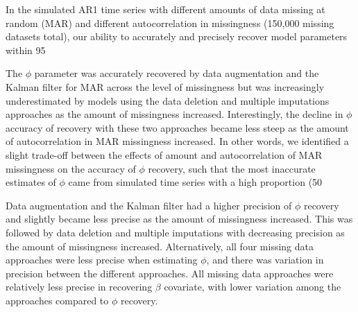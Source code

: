 In the simulated AR1 time series with different amounts of data missing at random (MAR) and different autocorrelation in missingness (150,000 missing datasets total), our ability to accurately and precisely recover model parameters within 95%

The $\phi$ parameter was accurately recovered by data augmentation and the Kalman filter for MAR across the level of missingness but was increasingly underestimated by models using the data deletion and multiple imputations approaches as the amount of missingness increased. Interestingly, the decline in $\phi$ accuracy of recovery with these two approaches became less steep as the amount of autocorrelation in MAR missingness increased.  In other words, we identified a slight trade-off between the effects of amount and autocorrelation of MAR missingness on the accuracy of $\phi$ recovery, such that the most inaccurate estimates of $\phi$ came from simulated time series with a high proportion (50%


Data augmentation and the Kalman filter had a higher precision of $\phi$ recovery and slightly became less precise as the amount of missingness increased. This was followed by data deletion and multiple imputations with decreasing precision as the amount of missingness increased. Alternatively, all four missing data approaches were less precise when estimating $\phi$, and there was variation in precision between the different approaches. All missing data approaches were relatively less precise in recovering $\beta$ covariate, with lower variation among the approaches compared to $\phi$ recovery. 

